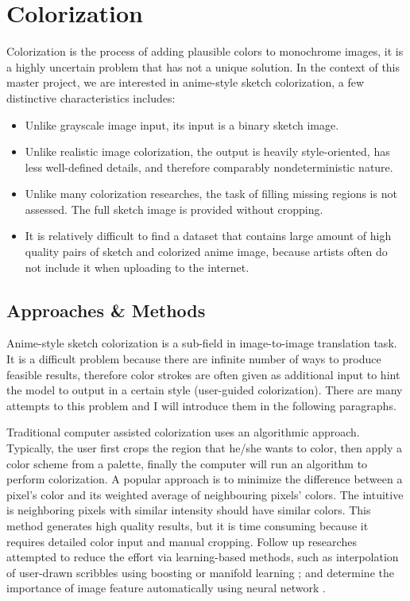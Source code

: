 \chapter{Colorization}
\label{chapterlabel3}

Colorization is the process of adding plausible colors to monochrome images, it is a highly uncertain problem that has not a unique solution. In the context of this master project, we are interested in anime-style sketch colorization, a few distinctive characteristics includes:

\begin{itemize}
    \item Unlike grayscale image input, its input is a binary sketch image.
    \item Unlike realistic image colorization, the output is heavily style-oriented, has less well-defined details, and therefore comparably nondeterministic nature.
    \item Unlike many colorization researches, the task of filling missing regions is not assessed. The full sketch image is provided without cropping.
    \item It is relatively difficult to find a dataset that contains large amount of high quality pairs of sketch and colorized anime image, because artists often do not include it when uploading to the internet.
\end{itemize}


\section{Approaches \& Methods}
Anime-style sketch colorization is a sub-field in image-to-image translation task. It is a difficult problem because there are infinite number of ways to produce feasible results, therefore color strokes are often given as additional input to hint the model to output in a certain style (user-guided colorization). There are many attempts to this problem and I will introduce them in the following paragraphs.

Traditional computer assisted colorization uses an algorithmic approach. Typically, the user first crops the region that he/she wants to color, then apply a color scheme from a palette, finally the computer will run an algorithm to perform colorization. A popular approach is to minimize the difference between a pixel's color and its weighted average of neighbouring pixels' colors.\cite{levinColorizationUsingOptimizationb} The intuitive is neighboring pixels with similar intensity should have similar colors. This method generates high quality results, but it is time consuming because it requires detailed color input and manual cropping. Follow up researches attempted to reduce the effort via learning-based methods, such as interpolation of user-drawn scribbles using boosting \cite{liScribbleBoostAddingClassification2008} or manifold learning \cite{chenManifoldPreservingEdit2012}; and determine the importance of image feature automatically using neural network \cite{endoDeepPropExtractingDeep2016}.



